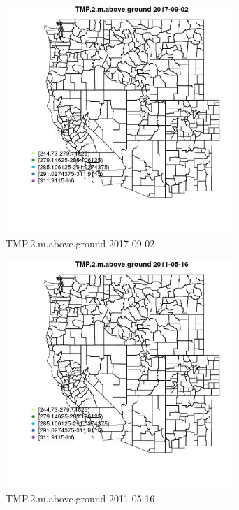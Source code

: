 \begin{figure} 
\centering  
\includegraphics[width=0.77\textwidth]{Code_Outputs/Report_ML_input_PM25_Step4_part_e_de_duplicated_aveswNAs_MapObsTMP2maboveground2017-09-02.jpg} 
\caption{\label{fig:Report_ML_input_PM25_Step4_part_e_de_duplicated_aveswNAsMapObsTMP2maboveground2017-09-02}TMP.2.m.above.ground 2017-09-02} 
\end{figure} 
 

\begin{figure} 
\centering  
\includegraphics[width=0.77\textwidth]{Code_Outputs/Report_ML_input_PM25_Step4_part_e_de_duplicated_aveswNAs_MapObsTMP2maboveground2011-05-16.jpg} 
\caption{\label{fig:Report_ML_input_PM25_Step4_part_e_de_duplicated_aveswNAsMapObsTMP2maboveground2011-05-16}TMP.2.m.above.ground 2011-05-16} 
\end{figure} 
 

